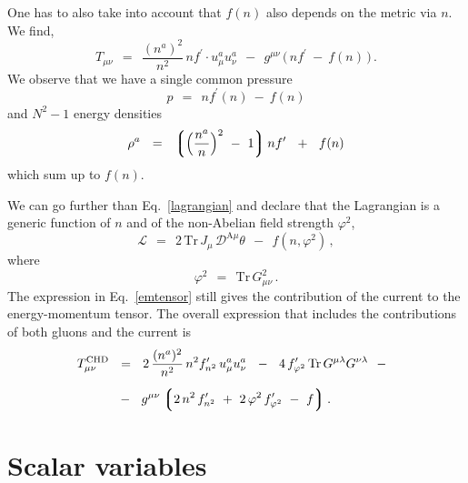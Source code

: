 \documentclass[epsfig,12pt]{article}
\def\beq{\begin{equation}}
\def\eeq{\end{equation}}
\newcommand{\md}{\mathcal{D}}
\newcommand{\ml}{\mathcal{L}}
\newcommand{\lgr}{\left\lgroup}
\newcommand{\rgr}{\right\rgroup}
\newcommand{\Tr}{\text{Tr}}
\begin{document}
	One has to also take into account that $ f(n) $ also depends on the metric via $ n $.
	We find,
\beq
\label{emtensor}
	T_{\mu\nu}    ~~=~~
				\frac{(n^a)^2}{n^2}\, n f^\prime \cdot u_\mu^a u_\nu^a  ~~-~~
				g^{\mu\nu}\, \big(\, n f^\prime ~-~ f(n) \,\big)\,.
\eeq
	We observe that we have a single common pressure
\beq
	p    ~~=~~    n f^\prime(n) ~-~ f(n)
\eeq
	and $ N^2 - 1 $ energy densities
\beq
	\rho^a    ~~=~~    \lgr \Big( \frac{n^a}{n} \Big)^2 ~-~ 1 \rgr n f^\prime  ~~+~~ f(n)
\eeq
	which sum up to $ f(n) $.

        We can go further than Eq.~\eqref{lagrangian} and declare that the Lagrangian
        is a generic function of $ n $ and of the non-Abelian field strength $ \varphi^2 $,
\beq
\label{generic}
        \ml    ~~=~~    2\, \Tr\, J_\mu\,  \md^{\text{A}\mu} \theta   ~~-~~  f(n, \varphi^2)\,,
\eeq
        where
\beq
        \varphi^2    ~~=~~    \Tr\, G_{\mu\nu}^2\,.
\eeq
	The expression in Eq.~\eqref{emtensor} still gives the contribution of the current to the energy-momentum tensor.
	The overall expression that includes the contributions of both gluons and the current is
\begin{align}
\notag
	T_{\mu\nu}^\text{CHD}   & 
			~~=~~
				2\, \frac{(n^a)^2}{n^2}\, n^2 f_{n^2}^\prime\, u_\mu^a u_\nu^a  ~~-~~
				4\, f_{\varphi^2}^\prime\, \Tr\, G^{\mu\lambda} G^{\nu\lambda}  ~~-~~
	\\[2mm]
\label{TCHD}
	& 
			~~-~~
				g^{\mu\nu} \lgr 2\, n^2\, f_{n^2}^\prime  ~+~  2\, \varphi^2\, f_{\varphi^2}^\prime  ~-~  f \rgr .
\end{align}




\section{Scalar variables}
\end{document}
